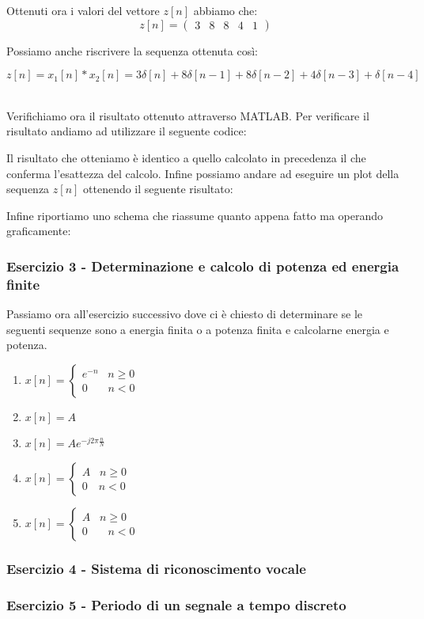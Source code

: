 \documentclass[../main.tex]{subfiles}
\begin{document}
Ottenuti ora i valori del vettore $z[n]$ abbiamo che:
\[ z[n] = \begin{pmatrix}
	3&8&8&4&1
\end{pmatrix} \]

Possiamo anche riscrivere la sequenza ottenuta così:

\[ z[n] = x_1[n] \ast x_2[n] = 3\delta[n] + 8\delta[n-1] + 8\delta[n-2] + 4\delta[n-3] + \delta[n-4] \]\

Verifichiamo ora il risultato ottenuto attraverso MATLAB.
Per verificare il risultato andiamo ad utilizzare il seguente codice:


Il risultato che otteniamo è identico a quello calcolato in precedenza il che conferma l'esattezza del calcolo.
Infine possiamo andare ad eseguire un plot della sequenza $z[n]$ ottenendo il seguente risultato:



Infine riportiamo uno schema che riassume quanto appena fatto ma operando graficamente:



\subsubsection{Esercizio 3 - Determinazione e calcolo di potenza ed energia finite}

Passiamo ora all'esercizio successivo dove ci è chiesto di determinare se le seguenti sequenze sono a energia finita o a potenza finita e calcolarne energia e potenza. 

\begin{enumerate}
	\item [\textbf{a)}]  $ x[n] = \begin{cases} e^{-n} \hspace{10pt} n \geq 0 \\ 0 \hspace{22pt} n < 0 \end{cases}$
	\item [\textbf{b)}] $x[n] = A$
	\item [\textbf{c)}] $x[n] = Ae^{-j2\pi \tfrac{n}{N}}$
	\item [\textbf{d)}] $ x[n] = \begin{cases} A\hspace{10pt} n \geq 0 \\ 0 \hspace{12pt} n < 0 \end{cases}$
	\item [\textbf{e)}] $ x[n] = \begin{cases} A \hspace{10pt} n \geq 0 \\ 0 \hspace{22pt} n < 0 \end{cases}$




\end{enumerate}

\subsubsection{Esercizio 4 - Sistema di riconoscimento vocale}
\subsubsection{Esercizio 5 - Periodo di un segnale a tempo discreto}
\end{document}
